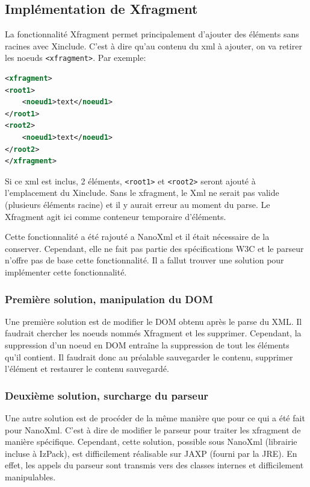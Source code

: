\subsection{Implémentation de Xfragment}
La fonctionnalité Xfragment permet principalement d'ajouter des éléments sans racines avec Xinclude.
C'est à dire qu'au contenu du xml à ajouter, on va retirer les noeuds \verb|<xfragment>|.
Par exemple:
\begin{lstlisting}[language=xml]
<xfragment>
<root1>
	<noeud1>text</noeud1>
</root1>
<root2>
	<noeud1>text</noeud1>
</root2>
</xfragment>
\end{lstlisting}
Si ce xml est inclus, 2 éléments, \verb|<root1>| et \verb|<root2>| seront ajouté à l'emplacement du Xinclude.
Sans le xfragment, le Xml ne serait pas valide (plusieurs éléments racine) et il y aurait erreur au moment du parse.
Le Xfragment agit ici comme conteneur temporaire d'éléments.

Cette fonctionnalité a été rajouté a NanoXml et il était nécessaire de la conserver.
Cependant, elle ne fait pas partie des spécifications W3C et le parseur n'offre pas de base cette fonctionnalité.
Il a fallut trouver une solution pour implémenter cette fonctionnalité.

\subsubsection{Première solution, manipulation du DOM}
Une première solution est de modifier le DOM obtenu après le parse du XML. 
Il faudrait chercher les noeuds nommés Xfragment et les supprimer.
Cependant, la suppression d'un noeud en DOM entraîne la suppression de tout les éléments qu'il contient.
Il faudrait donc au préalable sauvegarder le contenu, supprimer l'élément et restaurer le contenu sauvegardé.

\subsubsection{Deuxième solution, surcharge du parseur}
Une autre solution est de procéder de la même manière que pour ce qui a été fait pour NanoXml.
C'est à dire de modifier le parseur pour traiter les xfragment de manière spécifique.
Cependant, cette solution, possible sous NanoXml (librairie incluse à IzPack), est difficilement réalisable sur JAXP (fourni par la JRE).
En effet, les appels du parseur sont transmis vers des classes internes et difficilement manipulables.

